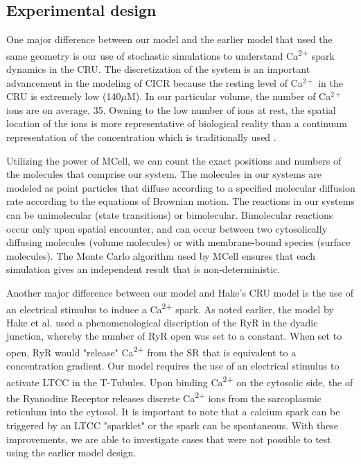 \documentclass[12pt]{ucsddissertation}
\begin{document}
\subsection{Experimental design}
One major difference between our model and the earlier model that used the same geometry \cite{Hake2012} is our use of stochastic simulations to understand Ca\textsuperscript{2+} spark dynamics in the CRU. The discretization of the system is an important advancement in the modeling of CICR because the resting level of Ca$^{2+}$ in the CRU is extremely low (140$\mu$M). In our particular volume, the number of Ca$^{2+}$ ions are on average, 35. Owning to the low number of ions at rest, the spatial location of the ions is more representative of biological reality than a continuum representation of the concentration which is traditionally used \cite{Bers2002,Maleckar2017}. 

Utilizing the power of MCell, we can count the exact positions and numbers of the molecules that comprise our system. The molecules in our systems are modeled as point particles that diffuse according to a specified molecular diffusion rate according to the equations of Brownian motion\cite{Stiles2001a}. The reactions in our systems can be unimolecular (state transitions) or bimolecular. Bimolecular reactions occur only upon spatial encounter, and can occur between two cytosolically diffusing molecules (volume molecules) or with membrane-bound species (surface molecules). The Monte Carlo algorithm used by MCell ensures that each simulation gives an independent result that is non-deterministic.

Another major difference between our model and Hake's CRU model is the use of an electrical stimulus to induce a Ca\textsuperscript{2+} spark. As noted earlier, the model by Hake et al. used a phenomenological discription of the RyR in the dyadic junction, whereby the number of RyR open was set to a constant. When set to open, RyR would "release" Ca\textsuperscript{2+} from the SR that is equivalent to a concentration gradient. Our model requires the use of an electrical stimulus to activate LTCC in the T-Tubules. Upon binding Ca\textsuperscript{2+} on the cytosolic side, the of the Ryanodine Receptor releases discrete Ca\textsuperscript{2+} ions from the sarcoplasmic reticulum into the cytosol. It is important to note that a calcium spark can be triggered by an LTCC "sparklet" or the spark can be spontaneous. With these improvements, we are able to investigate cases that were not possible to test using the earlier model design.
\end{document}
